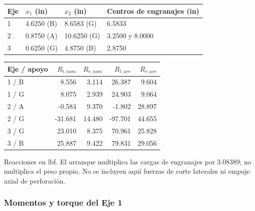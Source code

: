 \documentclass[11pt,a4paper]{article}
\begin{document}
\begin{center}\small\begin{tabular}{llll}\toprule

Eje & $x_1$ (in) & $x_2$ (in) & Centros de engranajes (in) \\ \midrule

1 & 4.6250 (B) & 8.6583 (G) & 6.5833 \\

2 & 0.8750 (A) & 10.6250 (G) & 3.2500 y 8.0000 \\

3 & 0.6250 (G) & 4.8750 (B) & 2.8750 \\

\bottomrule\end{tabular}\end{center}

\begin{center}\small\begin{tabular}{lrrrr}\toprule

Eje / apoyo & $R_{t,nom}$ & $R_{r,nom}$ & $R_{t,arr}$ & $R_{r,arr}$ \\ \midrule

1 / B & 8.556 & 3.114 & 26.387 & 9.604 \\

1 / G & 8.075 & 2.939 & 24.903 & 9.064 \\

2 / A & -0.584 & 9.370 & -1.802 & 28.897 \\

2 / G & -31.681 & 14.480 & -97.701 & 44.655 \\

3 / G & 23.010 & 8.375 & 70.961 & 25.828 \\

3 / B & 25.887 & 9.422 & 79.831 & 29.056 \\

\bottomrule\end{tabular}\end{center}

Reacciones en lbf. El arranque multiplica las cargas de engranajes por 3.08389; no multiplica el peso propio. No se incluyen aquí fuerzas de corte laterales ni empuje axial de perforación.

\subsubsection*{Momentos y torque del Eje 1}
\end{document}
